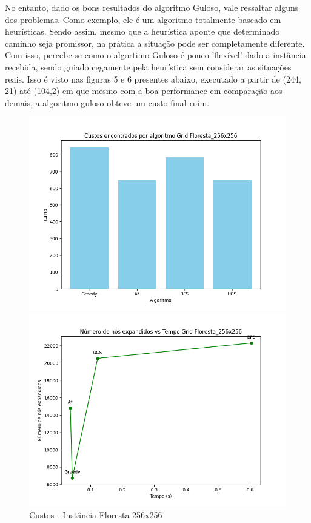 \documentclass[10pt]{extarticle} %
\begin{document}
No entanto, dado os bons resultados do algoritmo Guloso, vale ressaltar alguns dos problemas. Como exemplo, ele é um algoritmo totalmente baseado em heurísticas. Sendo assim, mesmo que a heurística aponte que determinado caminho seja promissor, na prática a situação pode ser completamente diferente. Com isso, percebe-se como o algortimo Guloso é pouco 'flexível' dado a instância recebida, sendo guiado cegamente pela heurística sem considerar as situações reais. Isso é visto nas figuras 5 e 6 presentes abaixo, executado a partir de (244, 21) até (104,2) em que mesmo com a boa performance em comparação aos demais, a algoritmo guloso obteve um custo final ruim.

\begin{figure}[H]
    \centering
    \begin{minipage}{0.5\linewidth}
        \centering
        \includegraphics[width=\linewidth]{cost_per_algorithm_Floresta_256x256.png}
        \caption{Custos - Instância Floresta 256x256}
        \label{fig:cost-per-algorithm}
    \end{minipage}%
    \begin{minipage}{0.5\linewidth}
        \centering
        \includegraphics[width=\linewidth]{expanded_nodes_vs_time_labeled_Floresta_256x256.png}

\end{minipage}
\end{figure}
\end{document}
